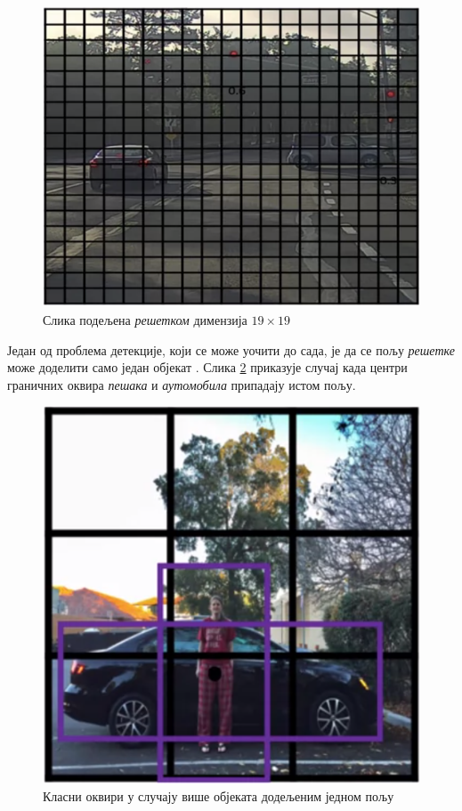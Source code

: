 \documentclass[12pt, а4paper]{article}
\begin{document}
\begin{figure}[H]
  \centering
      \includegraphics[scale=0.55]{slike/ngNonMax2.png}
  \caption{Слика подељена \textit{решетком} димензија $19 \times 19$}
  \label{fig:ng_NonMax2}
\end{figure}

Један од проблема детекције, који се може уочити до сада, је да се пољу
\textit{решетке} може доделити само један објекат \cite{ngAnchor}.
Слика \ref{fig:ng_Anchor1} приказује случај када центри граничних оквира
\textit{пешака} и \textit{аутомобила} припадају истом пољу.

\begin{figure}[H]
  \centering
      \includegraphics[scale=0.55]{slike/ngAnchor1.png}
  \caption{Класни оквири у случају више објеката додељеним једном пољу}
  \label{fig:ng_Anchor1}
\end{figure}
\end{document}

